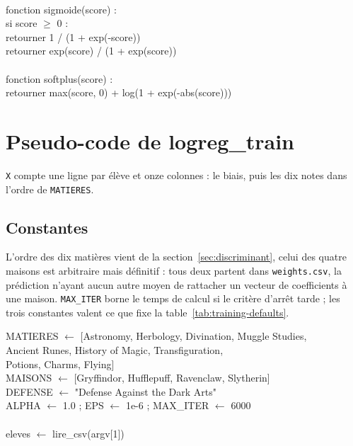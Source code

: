 \begin{pseudo}[primitives]
\\
fonction sigmoide(score) :\\
\hspace*{2em}si score $\geq$ 0 :\\
\hspace*{4em}retourner 1 / (1 + exp(-score))\\
\hspace*{2em}retourner exp(score) / (1 + exp(score))\\
\\
fonction softplus(score) :\\
\hspace*{2em}retourner max(score, 0) + log(1 + exp(-abs(score)))
\end{pseudo}

\section{Pseudo-code de logreg\_train}
\label{sec:pseudo-train}

\texttt{X} compte une ligne par élève et onze colonnes : le biais, puis les dix
notes dans l'ordre de \texttt{MATIERES}.

\subsection{Constantes}

L'ordre des dix matières vient de la section~\ref{sec:discriminant}, celui des
quatre maisons est arbitraire mais définitif : tous deux partent dans
\texttt{weights.csv}, la prédiction n'ayant aucun autre moyen de rattacher un
vecteur de coefficients à une maison. \texttt{MAX\_ITER} borne le temps de
calcul si le critère d'arrêt tarde ; les trois constantes valent ce que fixe la
table~\ref{tab:training-defaults}.

\begin{pseudo}
MATIERES $\leftarrow$ [Astronomy, Herbology, Divination, Muggle Studies,\\
\hspace*{5em}Ancient Runes, History of Magic, Transfiguration,\\
\hspace*{5em}Potions, Charms, Flying]\\
MAISONS $\leftarrow$ [Gryffindor, Hufflepuff, Ravenclaw, Slytherin]\\
DEFENSE $\leftarrow$ "Defense Against the Dark Arts"\\
ALPHA $\leftarrow$ 1.0 ; EPS $\leftarrow$ 1e-6 ; MAX\_ITER $\leftarrow$ 6000\\
\\
eleves $\leftarrow$ lire\_csv(argv[1])
\end{pseudo}

